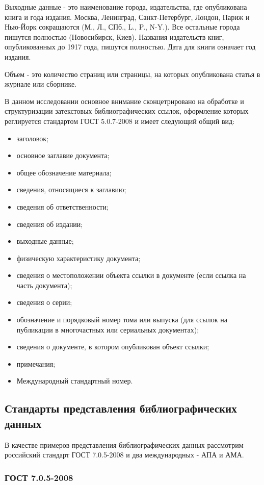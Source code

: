 Выходные данные - это наименование города, издательства, где опубликована книга и года издания. Москва, Ленинград, Санкт-Петербург, Лондон, Париж и Нью-Йорк сокращаются (М., Л., СПб., L., P., N-Y.). Все остальные города пишутся полностью (Новосибирск, Киев). Названия издательств книг, опубликованных до 1917 года, пишутся полностью. Дата для книги означает год издания.

Объем - это количество страниц или страницы, на которых опубликована статья в журнале или сборнике.

В данном исследовании основное внимание сконцетрировано на обработке и структуризации затекстовых библиографических ссылок, оформление которых реглируется стандартом ГОСТ 5.0.7-2008 и имеет следующий общий вид:
\begin{itemize}
	\item заголовок;
	\item основное заглавие документа;
	\item общее обозначение материала;
	\item сведения, относящиеся к заглавию;
	\item сведения об ответственности;
	\item сведения об издании;
	\item выходные данные;
	\item физическую характеристику документа;
	\item сведения о местоположении объекта ссылки в документе (если ссылка на часть документа);
	\item сведения о серии;
	\item обозначение и порядковый номер тома или выпуска (для ссылок на публикации в многочастных или сериальных документах);
	\item сведения о документе, в котором опубликован объект ссылки;
	\item примечания;
	\item Международный стандартный номер.
\end{itemize}

\subsection{Стандарты представления библиографических данных}

В качестве примеров представления библиографических данных рассмотрим российский стандарт ГОСТ 7.0.5-2008 и два международных - АПА и АМА.

\subsubsection*{ГОСТ 7.0.5-2008}

